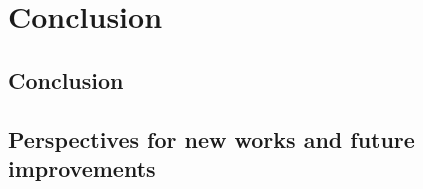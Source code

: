 
\chapter{Conclusion}
\label{ch:Conclusion} 

\section{Conclusion}

\section{Perspectives for new works and future improvements}
